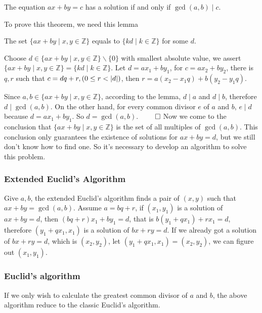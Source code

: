 \begin{thm}
The equation $ax + by = c$ has a solution if and only if $\gcd(a, b) \mid c$.
\end{thm}
To prove this theorem, we need this lemma
\begin{lem}
The set $\{ax + by \mid x, y \in \mathbb{Z}\}$ equals to $\{kd \mid k \in \mathbb{Z}\}$ for some $d$.
\end{lem}
\begin{prf}
Choose $d \in \{ax + by \mid x, y \in \mathbb{Z}\} \backslash \{0\}$ with smallest absolute value,
we assert $\{ax + by \mid x, y \in \mathbb{Z}\} = \{kd \mid k \in \mathbb{Z}\}$.
Let $d = ax_1 + by_1$, for $c = ax_2 + by_2$, there is $q, r$ such that $c = dq + r, (0 \leq r < \left| {d} \right|)$,
then $r = a(x_2 - x_1q) + b(y_2 - y_1q)$.
\end{prf}

Since $a, b \in \{ax + by \mid x, y \in \mathbb{Z}\}$, according to the lemma, $d \mid a$ and $d \mid b$,
therefore $d \mid \gcd(a, b)$. On the other hand, for every common divisor $e$ of $a$ and $b$,
$e \mid d$ because $d = ax_1 + by_1$. So $d = \gcd(a, b)$. $\qed$
Now we come to the conclusion that $\{ax + by \mid x, y \in \mathbb{Z}\}$ is the set of all multiples of $\gcd(a, b)$.
This conclusion only guarantees the existence of solutions for $ax + by = d$, but we still don't know how to find one.
So it's necessary to develop an algorithm to solve this problem.

\subsubsection{Extended Euclid's Algorithm}
Give $a, b$, the extended Euclid's algorithm finds a pair of $(x, y)$ such that $ax + by = \gcd(a, b)$.
Assume $a = bq + r$, if $(x_1, y_1)$ is a solution of $ax + by = d$,
then $(bq + r)x_1 + by_1 = d$, that is $b(y_1 + qx_1) + rx_1 = d$,
therefore $(y_1 + qx_1, x_1)$ is a solution of $bx + ry = d$.
If we already got a solution of $bx + ry = d$, which is $(x_2, y_2)$,
let $(y_1 + qx_1, x_1) = (x_2, y_2)$, we can figure out $(x_1, y_1)$.


\subsubsection{Euclid's algorithm}
If we only wish to calculate the greatest common divisor of $a$ and $b$,
the above algorithm reduce to the classic Euclid's algorithm.



